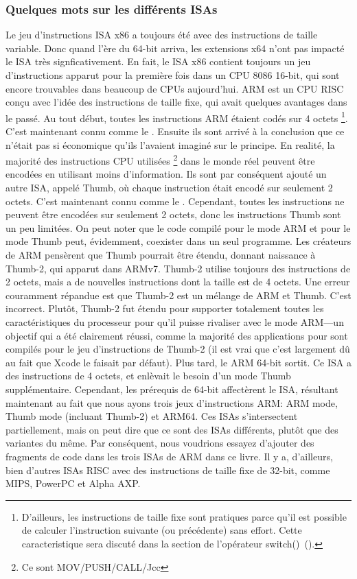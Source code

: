 %
%
%

\subsubsection{Quelques mots sur les différents \ac{ISA}s}
Le jeu d'instructions \ac{ISA} x86 a toujours été avec des instructions de taille variable. Donc quand l'ère du 64-bit arriva, les extensions x64 n'ont pas impacté le \ac{ISA} très signficativement. En fait, le \ac{ISA} x86 contient toujours un jeu d'instructions apparut pour la première fois dans un CPU 8086 16-bit, qui sont encore trouvables dans beaucoup de CPUs aujourd'hui.
ARM est un \ac{CPU} \ac{RISC} conçu avec l'idée des instructions de taille fixe, qui avait quelques avantages dans le passé.
Au tout début, toutes les instructions ARM étaient codés sur 4 octets%
\footnote{D'ailleurs, les instructions de taille fixe sont pratiques parce qu'il est possible de calculer l'instruction suivante (ou précédente) sans effort. Cette caracteristique sera discuté dans la section de l'opérateur switch()~().}.
C'est maintenant connu comme le .
Ensuite ils sont arrivé à la conclusion que ce n'était pas si économique qu'ils l'avaient imaginé sur le principe.
En realité, la majorité des instructions \ac{CPU} utilisées \footnote{Ce sont MOV/PUSH/CALL/Jcc} dans le monde réel peuvent être encodées en utilisant moins d'information.
Ils sont par conséquent ajouté un autre \ac{ISA}, appelé Thumb, où chaque instruction était encodé sur seulement 2 octets.
C'est maintenant connu comme le .
Cependant, toutes les instructions ne peuvent être encodées sur seulement 2 octets, donc les instructions Thumb sont un peu limitées.
On peut noter que le code compilé pour le mode ARM et pour le mode Thumb peut, évidemment, coexister dans un seul programme.
Les créateurs de ARM pensèrent que Thumb pourrait être étendu, donnant naissance à Thumb-2, qui apparut dans ARMv7.
Thumb-2 utilise toujours des instructions de 2 octets, mais a de nouvelles instructions dont la taille est de 4 octets.
Une erreur couramment répandue est que Thumb-2 est un mélange de ARM et Thumb. C'est incorrect.
Plutôt, Thumb-2 fut étendu pour supporter totalement toutes les caractéristiques du processeur pour qu'il puisse
rivaliser avec le mode ARM---un objectif qui a été clairement réussi, comme la majorité des applications pour \idevices sont compilés pour le jeu d'instructions de Thumb-2 (il est vrai que c'est largement dû au fait que Xcode le faisait par défaut).
Plus tard, le ARM 64-bit sortit. Ce \ac{ISA} a des instructions de 4 octets, et enlèvait le besoin d'un mode Thumb supplémentaire.
Cependant, les prérequis de 64-bit affectèrent le \ac{ISA}, résultant maintenant au fait que nous ayons trois jeux d'instructions ARM: ARM mode, Thumb mode (incluant Thumb-2) et ARM64.
Ces \ac{ISA}s s'intersectent partiellement, mais on peut dire que ce sont des \ac{ISA}s différents, plutôt que des variantes du même.
Par conséquent, nous voudrions essayez d'ajouter des fragments de code dans les trois \ac{ISA}s de ARM dans ce livre.
%
%
%
Il y a, d'ailleurs, bien d'autres \ac{ISA}s \ac{RISC} avec des instructions de taille fixe de 32-bit, comme MIPS, PowerPC et Alpha AXP.
